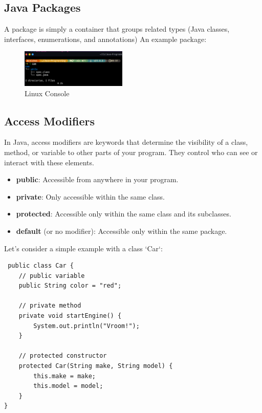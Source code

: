 \documentclass{book}
\begin{document}
\subsection{Java Packages}
A package is simply a container that groups related types (Java classes, interfaces, enumerations, and annotations)
An example package:
\begin{figure}
	\centering
	\includegraphics[width=0.45\textwidth]{package.png}
	\caption{Linux Console}\label{fig:}
\end{figure}

\subsection{Access Modifiers}
In Java, access modifiers are keywords that determine the visibility of a class, method, or variable to other parts of your program. They control
who can see or interact with these elements.
\begin{itemize}

	\item \textbf{public}: Accessible from anywhere in your program.
	\item \textbf{private}: Only accessible within the same class.
	\item \textbf{protected}: Accessible only within the same class and its subclasses.
	\item \textbf{default} (or no modifier): Accessible only within the same package.
\end{itemize}
Let's consider a simple example with a class `Car`:
\begin{verbatim}
 public class Car {
    // public variable
    public String color = "red";

    // private method
    private void startEngine() {
        System.out.println("Vroom!");
    }

    // protected constructor
    protected Car(String make, String model) {
        this.make = make;
        this.model = model;
    }
}  
\end{verbatim}
\end{document}
